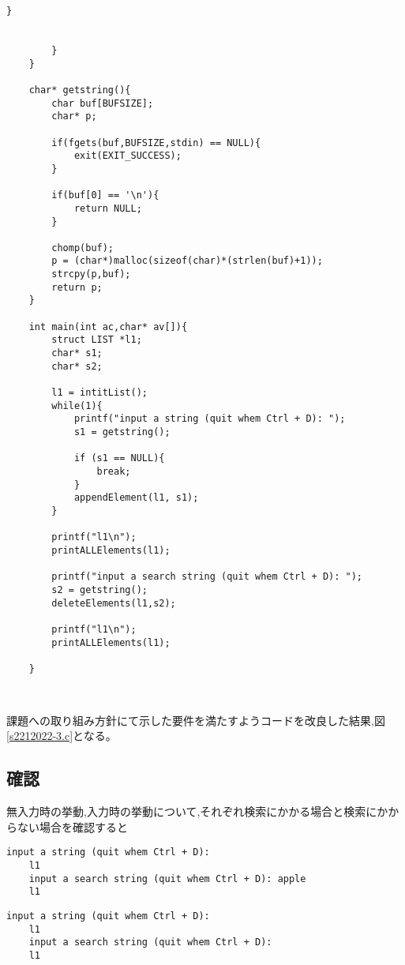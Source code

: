 \documentclass[fontsize = 10pt, paper= a4,twocolumn,column_gap=3zw]{jlreq}
\begin{document}
\begin{lstlisting}[basicstyle=\ttfamily\footnotesize, frame=single, caption=s2212022-3.c,label=s2212022-3.c]
            }
    
    
        }
    }    
    
    char* getstring(){
        char buf[BUFSIZE];
        char* p;
        
        if(fgets(buf,BUFSIZE,stdin) == NULL){
            exit(EXIT_SUCCESS);
        }
    
        if(buf[0] == '\n'){
            return NULL;
        }
    
        chomp(buf);
        p = (char*)malloc(sizeof(char)*(strlen(buf)+1));
        strcpy(p,buf);
        return p;
    }    
    
    int main(int ac,char* av[]){
        struct LIST *l1;
        char* s1;
        char* s2;
    
        l1 = intitList();
        while(1){
            printf("input a string (quit whem Ctrl + D): ");
            s1 = getstring();
    
            if (s1 == NULL){
                break;
            }
            appendElement(l1, s1);
        }
    
        printf("l1\n");
        printALLElements(l1);
    
        printf("input a search string (quit whem Ctrl + D): ");
        s2 = getstring();
        deleteElements(l1,s2);
    
        printf("l1\n");
        printALLElements(l1);
    
    }    
    
    
\end{lstlisting}

課題への取り組み方針にて示した要件を満たすようコードを改良した結果,図\ref{s2212022-3.c}となる。

\subsection{確認}
無入力時の挙動,入力時の挙動について,それぞれ検索にかかる場合と検索にかからない場合を確認すると
\begin{lstlisting}[basicstyle=\ttfamily\footnotesize, frame=single, caption=test9,label=test9]
    input a string (quit whem Ctrl + D):
    l1
    input a search string (quit whem Ctrl + D): apple
    l1    
\end{lstlisting}

\begin{lstlisting}[basicstyle=\ttfamily\footnotesize, frame=single, caption=test10,label=test10]
    input a string (quit whem Ctrl + D):
    l1
    input a search string (quit whem Ctrl + D):
    l1    
\end{lstlisting}
\end{document}
